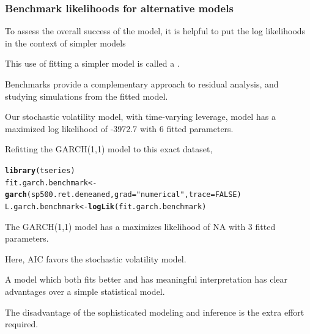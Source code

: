 \documentclass{beamer}\usepackage[]{graphicx}\usepackage[]{color}
\makeatletter
\newcommand{\hlnum}[1]{\textcolor[rgb]{0.686,0.059,0.569}{#1}}%
\newcommand{\hlstr}[1]{\textcolor[rgb]{0.192,0.494,0.8}{#1}}%
\newcommand{\hlstd}[1]{\textcolor[rgb]{0.345,0.345,0.345}{#1}}%
\newcommand{\hlkwb}[1]{\textcolor[rgb]{0.69,0.353,0.396}{#1}}%
\newcommand{\hlkwc}[1]{\textcolor[rgb]{0.333,0.667,0.333}{#1}}%
\newcommand{\hlkwd}[1]{\textcolor[rgb]{0.737,0.353,0.396}{\textbf{#1}}}%
\newenvironment{kframe}{%
 \def\at@end@of@kframe{}%
 \ifinner\ifhmode%
  \def\at@end@of@kframe{\end{minipage}}%
  \begin{minipage}{\columnwidth}%
 \fi\fi%
 \def\FrameCommand##1{\hskip\@totalleftmargin \hskip-\fboxsep
 \colorbox{shadecolor}{##1}\hskip-\fboxsep
     \hskip-\linewidth \hskip-\@totalleftmargin \hskip\columnwidth}%
 \MakeFramed {\advance\hsize-\width
   \@totalleftmargin\z@ \linewidth\hsize
   \@setminipage}}%
 {\par\unskip\endMakeFramed%
 \at@end@of@kframe}
\newenvironment{knitrout}{}{} %
\makeatother
\begin{document}
\begin{frame}[fragile]

\frametitle{Benchmark likelihoods for alternative models}

\bi

\item To assess the overall success of the model, it is helpful to put the log likelihoods in the context of simpler models

\item This use of fitting a simpler model is called a . 

\item Benchmarks provide a complementary approach to residual analysis, and studying simulations from the fitted model.

\item Our stochastic volatility model, with time-varying leverage, model has a maximized log likelihood of -3972.7 with 6 fitted parameters.


\item Refitting the GARCH(1,1) model to this exact dataset,

\ei

\begin{knitrout}\small
{}\color{fgcolor}\begin{kframe}
\begin{alltt}
\hlkwd{library}\hlstd{(tseries)}
\hlstd{fit.garch.benchmark} \hlkwb{<-} \hlkwd{garch}\hlstd{(sp500.ret.demeaned,}\hlkwc{grad} \hlstd{=} \hlstr{"numerical"}\hlstd{,} \hlkwc{trace} \hlstd{=} \hlnum{FALSE}\hlstd{)}
\hlstd{L.garch.benchmark} \hlkwb{<-} \hlkwd{logLik}\hlstd{(fit.garch.benchmark)}
\end{alltt}
\end{kframe}
\end{knitrout}

\bi

\item The GARCH(1,1) model has a maximizes likelihood of NA with 3 fitted parameters.

\item Here, AIC favors the stochastic volatility model.

\item A model which both fits better and has meaningful interpretation has clear advantages over a simple statistical model. 

\item The disadvantage of the sophisticated modeling and inference is the extra effort required.

\ei

\end{frame}
\end{document}
